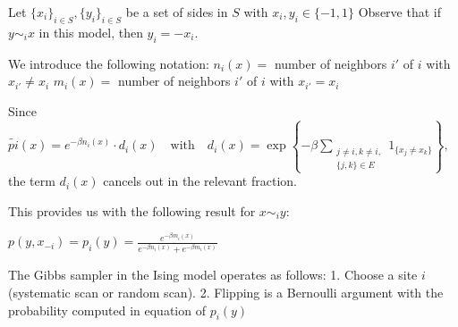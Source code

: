 Let \( \{x_i\}_{i \in S}, \{y_i\}_{i \in S} \) be a set of sides in \( S \) with \( x_i, y_i \in \{-1, 1\} \)
Observe that if \(y \sim_i x\) in this model, then \(y_i = -x_i\).

We introduce the following notation:
\(n_i(x) = \) number of neighbors \(i'\) of \(i\) with \(x_{i'} \neq x_i\)
\(m_i(x) = \) number of neighbors \(i'\) of \(i\) with \(x_{i'} = x_i\)

Since 
\(\tilde{pi}(x) = e^{-\beta n_i(x)} \cdot d_i(x) \quad \text{with} \quad d_i(x) = \exp \left\{ -\beta \sum_{\substack{j \neq i, k \neq i, \\ \{j, k\} \in E}} 1_{\{x_j \neq x_k\}} \right\},\)
the term \(d_i(x)\) cancels out in the relevant fraction.

This provides us with the following result for \(x \sim_i y\):

\(p(y,x_{-i}) = p_i(y) = \frac{e^{-\beta m_i(x)}}{e^{-\beta n_i(x)} + e^{-\beta m_i(x)}}\)

The Gibbs sampler in the Ising model operates as follows:
1. Choose a site \(i\) (systematic scan or random scan).
2. Flipping is a Bernoulli argument with the probability computed in equation of \( p_i(y) \)
